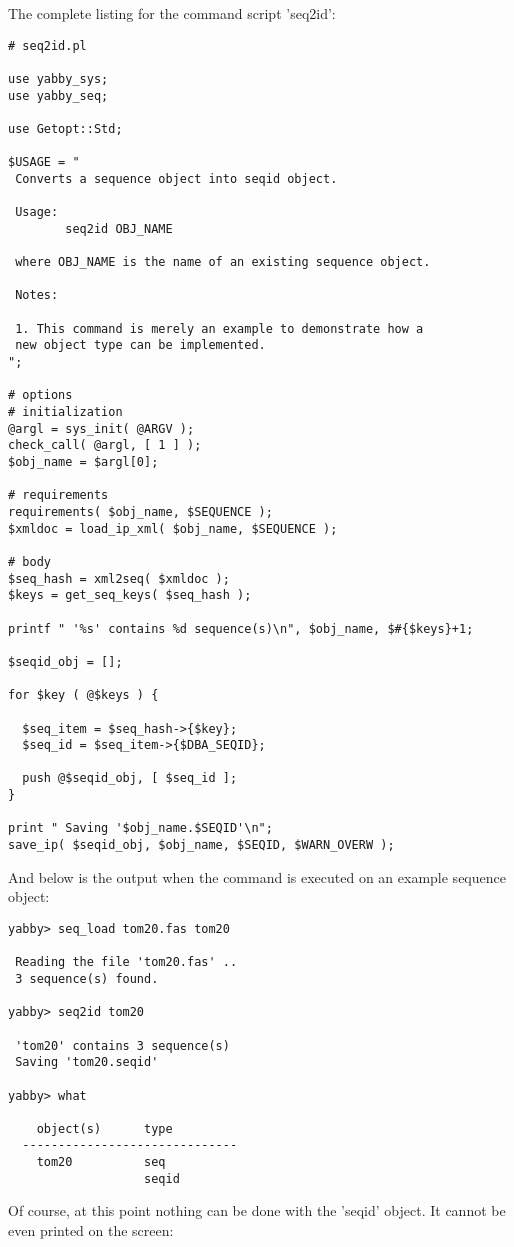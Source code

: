 The complete listing for the command script 'seq2id':

\begin{verbatim}
# seq2id.pl

use yabby_sys;
use yabby_seq;

use Getopt::Std;

$USAGE = "
 Converts a sequence object into seqid object.

 Usage:
        seq2id OBJ_NAME

 where OBJ_NAME is the name of an existing sequence object.

 Notes:

 1. This command is merely an example to demonstrate how a
 new object type can be implemented.
";

# options
# initialization
@argl = sys_init( @ARGV );
check_call( @argl, [ 1 ] );
$obj_name = $argl[0];

# requirements
requirements( $obj_name, $SEQUENCE );
$xmldoc = load_ip_xml( $obj_name, $SEQUENCE );

# body
$seq_hash = xml2seq( $xmldoc );
$keys = get_seq_keys( $seq_hash );

printf " '%s' contains %d sequence(s)\n", $obj_name, $#{$keys}+1;

$seqid_obj = [];

for $key ( @$keys ) {

  $seq_item = $seq_hash->{$key};
  $seq_id = $seq_item->{$DBA_SEQID};

  push @$seqid_obj, [ $seq_id ];
}

print " Saving '$obj_name.$SEQID'\n";
save_ip( $seqid_obj, $obj_name, $SEQID, $WARN_OVERW );
\end{verbatim}

And below is the output when the command is executed on an example
sequence object:

\begin{verbatim}
yabby> seq_load tom20.fas tom20

 Reading the file 'tom20.fas' ..
 3 sequence(s) found.

yabby> seq2id tom20

 'tom20' contains 3 sequence(s)
 Saving 'tom20.seqid'

yabby> what

    object(s)      type
  ------------------------------
    tom20          seq           
                   seqid         
\end{verbatim}

Of course, at this point nothing can be done with the 'seqid' object.
It cannot be even printed on the screen:

